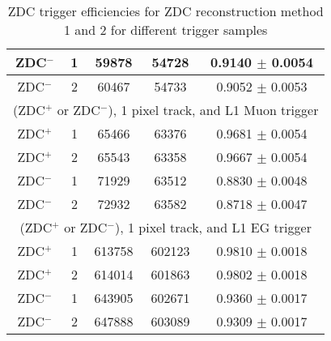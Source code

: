 \begin{table}
\begin{tabular}{|c|c|c|c|c|}
           ZDC$^{-}$ & 1 & 59878  & 54728  & 0.9140  $\pm$ 0.0054 \\ \hline
           ZDC$^{-}$ & 2 & 60467  & 54733  & 0.9052  $\pm$ 0.0053 \\ \hline
           \multicolumn{5}{|c|}{(ZDC$^{+}$ or ZDC$^{-}$), 1 pixel track, and L1 Muon trigger} \\ \hline 
           ZDC$^{+}$ & 1 & 65466  & 63376  & 0.9681 $\pm$ 0.0054  \\ \hline
           ZDC$^{+}$ & 2 & 65543  & 63358  & 0.9667 $\pm$ 0.0054 \\ \hline
           ZDC$^{-}$ & 1 & 71929  & 63512  & 0.8830  $\pm$ 0.0048 \\ \hline
           ZDC$^{-}$ & 2 & 72932  & 63582  & 0.8718  $\pm$ 0.0047 \\ \hline
           \multicolumn{5}{|c|}{(ZDC$^{+}$ or ZDC$^{-}$), 1 pixel track, and L1 EG trigger } \\ \hline 
           ZDC$^{+}$ & 1 & 613758  & 602123  & 0.9810 $\pm$ 0.0018 \\ \hline
           ZDC$^{+}$ & 2 & 614014  & 601863  & 0.9802 $\pm$ 0.0018 \\ \hline
           ZDC$^{-}$ & 1 & 643905  & 602671  & 0.9360  $\pm$ 0.0017 \\ \hline
           ZDC$^{-}$ & 2 & 647888  & 603089  & 0.9309  $\pm$ 0.0017 \\ \hline
        \end{tabular}
        \caption{ZDC trigger efficiencies for ZDC reconstruction method 1 and 
          2 for different trigger samples}
        \label{tab:zdcEfficiencySys}
      \end{table}
      

